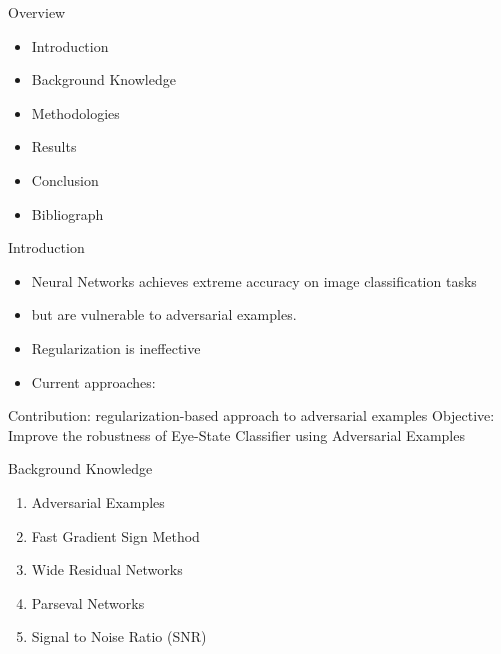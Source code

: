 \documentclass{beamer}		%
\begin{document}
\begin{frame}{Overview}	
\begin{itemize}
\item Introduction
\item Background Knowledge
\item Methodologies
\item Results
\item Conclusion
\item Bibliograph
\end{itemize}
\end{frame}	

\begin{frame}{Introduction}	
\begin{itemize}
\item Neural Networks achieves extreme accuracy on image classification tasks
\item but are vulnerable to adversarial examples.
\item Regularization is ineffective
\item Current approaches:
\end{itemize}
Contribution: regularization-based approach to adversarial examples
Objective: Improve the robustness of Eye-State Classifier using Adversarial Examples
\end{frame}	
\begin{frame}{Background Knowledge}	
\begin{enumerate}
    \item Adversarial Examples
    \item Fast Gradient Sign Method
    \item  Wide Residual Networks
    \item Parseval Networks
    \item Signal to Noise Ratio (SNR)
\end{enumerate}
\end{frame}	
\end{document}

